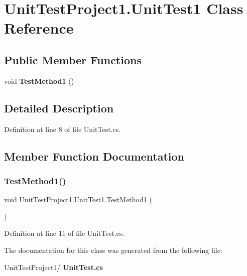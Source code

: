 \section{Unit\+Test\+Project1.\+Unit\+Test1 Class Reference}
\label{classUnitTestProject1_1_1UnitTest1}
\subsection*{Public Member Functions}
\begin{DoxyCompactItemize}
\item 
void \textbf{ Test\+Method1} ()
\end{DoxyCompactItemize}


\subsection{Detailed Description}


Definition at line 8 of file Unit\+Test.\+cs.



\subsection{Member Function Documentation}
\mbox{\label{classUnitTestProject1_1_1UnitTest1_ab8d78f432b13c60640430a30b20a07fc}} 
\subsubsection{Test\+Method1()}
{\footnotesize\ttfamily void Unit\+Test\+Project1.\+Unit\+Test1.\+Test\+Method1 (\begin{DoxyParamCaption}{ }\end{DoxyParamCaption})\hspace{0.3cm}{\ttfamily [inline]}}



Definition at line 11 of file Unit\+Test.\+cs.



The documentation for this class was generated from the following file\+:\begin{DoxyCompactItemize}
\item 
Unit\+Test\+Project1/\textbf{ Unit\+Test.\+cs}\end{DoxyCompactItemize}
